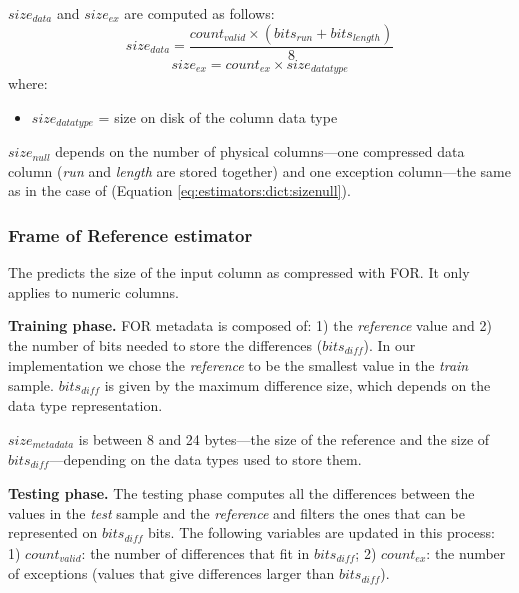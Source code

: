 \(size_{data}\) and \(size_{ex}\) are computed as follows:
\begin{equation}
\label{eq:estimators:rle:sizedata}
size_{data} = \frac{count_{valid} \times (bits_{run} + bits_{length})}{8}
\end{equation}
\begin{equation}
\label{eq:estimators:rle:sizeex}
size_{ex} = count_{ex} \times size_{datatype}
\end{equation}
where:
\begin{itemize}
    \item[] \(size_{datatype}\) = size on disk of the column data type
\end{itemize}

\(size_{null}\) depends on the number of physical columns---one compressed data column (\textit{run} and \textit{length} are stored together) and one exception column---the same as in the case of  (Equation \ref{eq:estimators:dict:sizenull}).



\subsubsection{Frame of Reference estimator}
\label{subsub:estimator:for}

The  predicts the size of the input column as compressed with FOR. It only applies to numeric columns.

\textbf{Training phase.} FOR metadata is composed of: 1) the \textit{reference} value and 2) the number of bits needed to store the differences (\(bits_{\mathit{diff}}\)). In our implementation we chose the \textit{reference} to be the smallest value in the \textit{train} sample. \(bits_{\mathit{diff}}\) is given by the maximum difference size, which depends on the data type representation.

\(size_{metadata}\) is between 8 and 24 bytes---the size of the reference and the size of \(bits_{\mathit{diff}}\)---depending on the data types used to store them.

\textbf{Testing phase.} The testing phase computes all the differences between the values in the \textit{test} sample and the \textit{reference} and filters the ones that can be represented on \(bits_{\mathit{diff}}\) bits. The following variables are updated in this process: 1) \(count_{valid}\): the number of differences that fit in \(bits_{\mathit{diff}}\); 2) \(count_{ex}\): the number of exceptions (values that give differences larger than \(bits_{\mathit{diff}}\)).

